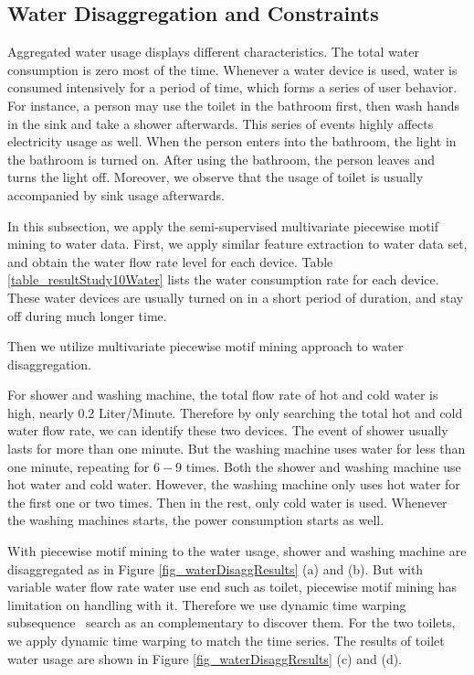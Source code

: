 \subsection{Water Disaggregation and Constraints}
Aggregated water usage displays different characteristics. 
The total water consumption is zero most of the time.
Whenever a water device is used, water is consumed intensively for a period of time,
which forms a series of user behavior. 
For instance, a person may use the toilet in the bathroom first, 
then wash hands in the sink and take a shower afterwards. 
This series of events highly affects electricity usage as well. 
When the person enters into the bathroom, the light in the bathroom is turned on. 
After using the bathroom, the person leaves and turns the light off. 
Moreover, we observe that the usage of toilet is usually accompanied by
sink usage afterwards. 

In this subsection, we apply the semi-supervised multivariate piecewise motif mining 
to water data. 
First, we apply similar feature extraction to water data set,
and obtain the water flow rate level for each device.
Table \ref{table_resultStudy10Water} lists the water consumption rate for each device.
These water devices are usually turned on in a short period of duration, 
and stay off during much longer time. 

Then we utilize multivariate piecewise motif mining approach to 
water disaggregation. 


For shower and washing machine, 
the total flow rate of hot and cold water is high,  nearly 0.2 Liter/Minute. 
Therefore by only searching the 
total hot and cold water flow rate, we can identify these two devices. 
The event of shower usually lasts for more than one minute. 
But the washing machine uses water for less than one minute, 
repeating for $6-9$ times. 
Both the shower and washing machine use 
hot water and cold water. 
However, the washing machine only uses hot water for the 
first one or two times. Then in the rest, 
only cold water is used. 
Whenever the washing machines starts, 
the power consumption starts as well. 


With piecewise motif mining to the water usage, 
shower and washing machine are disaggregated as in Figure \ref{fig_waterDisaggResults} (a) and (b).
But with variable water flow rate water use end such as toilet, 
piecewise motif mining has limitation on handling with it. 
Therefore we use dynamic time warping subsequence~\cite{rakthanmanon2012searching} search as an complementary to discover them.  
For the two toilets, we apply dynamic time warping to match the time series.
The results of toilet water usage are shown in Figure \ref{fig_waterDisaggResults} (c) and (d). 

